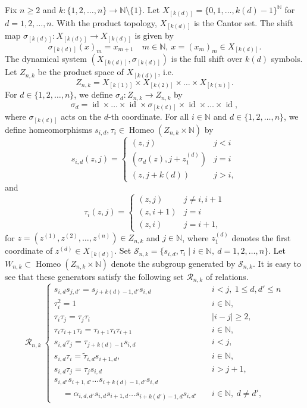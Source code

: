 \documentclass[11pt]{article}
\theoremstyle{definition}
\numberwithin{equation}{section}
\newcommand{\Homeo}{\operatorname{Homeo}}
\newcommand{\id}{\operatorname{id}}
\newcommand{\N}{\mathbb{N}}
\begin{document}
Fix $n\geq2$ and $k:\{1,2,\dots,n\}\to\N\setminus\{1\}$. 
Let $X_{[k(d)]}=\{0,1,\dots,k(d){-}1\}^\N$ for $d=1,2,\dots,n$. 
With the product topology, $X_{[k(d)]}$ is the Cantor set. 
The shift map $\sigma_{[k(d)]}:X_{[k(d)]}\to X_{[k(d)]}$ is given by 
\[
\sigma_{[k(d)]}(x)_m=x_{m+1}\quad m\in\N,\ x=(x_m)_m\in X_{[k(d)]}. 
\]
The dynamical system $(X_{[k(d)]},\sigma_{[k(d)]})$ is 
the full shift over $k(d)$ symbols. 
Let $Z_{n,k}$ be the product space of $X_{[k(d)]}$, i.e. 
\[
Z_{n,k}=X_{[k(1)]}\times X_{[k(2)]}\times\dots\times X_{[k(n)]}. 
\]
For $d\in\{1,2,\dots,n\}$, 
we define $\sigma_d:Z_{n,k}\to Z_{n,k}$ by 
\[
\sigma_d=\id\times\dots\times
\id\times\sigma_{[k(d)]}\times\id\times\dots\times\id,
\]
where $\sigma_{[k(d)]}$ acts on the $d$-th coordinate. 
For all $i\in\N$ and $d\in\{1,2,\dots,n\}$, 
we define homeomorphisms 
$s_{i,d},\tau_i\in\Homeo(Z_{n,k}\times\N)$ by 
\[
s_{i,d}(z,j)
=\begin{cases}(z,j)&j<i\\
\left(\sigma_d(z),j+z^{(d)}_1\right)&j=i\\
(z,j{+}k(d))&j>i, \end{cases}
\]
and 
\[
\tau_i(z,j)=\begin{cases}(z,j)&j\neq i,i{+}1\\
(z,i{+}1)&j=i\\(z,i)&j=i{+}1, \end{cases}
\]
for $z=(z^{(1)},z^{(2)},\dots,z^{(n)})\in Z_{n,k}$ and $j\in\N$, 
where $z^{(d)}_1$ denotes the first coordinate of $z^{(d)}\in X_{[k(d)]}$.
Set $\mathcal{S}_{n,k}=\{s_{i,d},\tau_i\mid i\in\N,\ d=1,2,\dots,n\}$. 
Let $W_{n,k}\subset\Homeo(Z_{n,k}\times\N)$ denote 
the subgroup generated by $\mathcal{S}_{n,k}$. 
It is easy to see that 
these generators satisfy the following set $\mathcal{R}_{n,k}$ of relations. 
\[
\mathcal{R}_{n,k}\ \begin{cases}
s_{i,d}s_{j,d'}=s_{j+k(d)-1,d'}s_{i,d}&\quad i<j,\ 1\leq d,d'\leq n \\
\tau_i^2=1&\quad i\in\N, \\
\tau_i\tau_j=\tau_j\tau_i&\quad \lvert i-j\rvert\geq2, \\
\tau_i\tau_{i+1}\tau_i=\tau_{i+1}\tau_i\tau_{i+1}&\quad i\in\N, \\
s_{i,d}\tau_j=\tau_{j+k(d)-1}s_{i,d}&\quad i<j, \\
s_{i,d}\tau_i=\tilde\tau_{i,d}s_{i+1,d},&\quad i\in\N, \\
s_{i,d}\tau_j=\tau_js_{i,d}&\quad i>j+1, \\
s_{i,d'}s_{i+1,d'}\dots s_{i+k(d)-1,d'}s_{i,d}& \\
\quad=\alpha_{i,d,d'}s_{i,d}s_{i+1,d}\dots s_{i+k(d')-1,d}s_{i,d'}&\quad 
i\in\N,\ d\neq d', 
\end{cases}
\]
\end{document}
